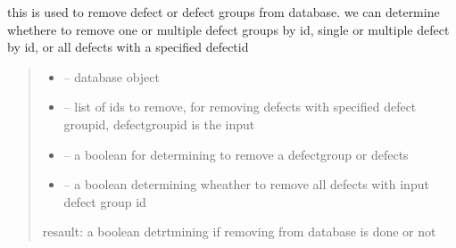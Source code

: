 \documentclass[letterpaper,10pt,english]{sphinxmanual}
\begin{document}

\begin{savenotes}\begin{fulllineitems}
\label{\detokenize{setting/backend/defect_management_funcs:oxin.backend.defect_management_funcs.remove_defects_from_db}}
\pysigstartsignatures
{}
\pysigstopsignatures
\sphinxAtStartPar
this is used to remove defect or defect groups from database.
we can determine whethere to remove one or multiple defect groups by id, single or multiple defect by id, or all defects with a specified defect\sphinxhyphen{}id
\begin{quote}\begin{description}
\begin{itemize}
\item {} 
\sphinxAtStartPar
{} – database object

\item {} 
\sphinxAtStartPar
{} – list of ids to remove, for removing defects with specified defect group\sphinxhyphen{}id, defect\sphinxhyphen{}group\sphinxhyphen{}id is the input

\item {} 
\sphinxAtStartPar
{} – a boolean for determining to remove a defect\sphinxhyphen{}group or defects

\item {} 
\sphinxAtStartPar
{} – a boolean determining wheather to remove all defects with input defect group id

\end{itemize}

\sphinxAtStartPar
resault: a boolean detrtmining if removing from database is done or not

\end{description}\end{quote}

\end{fulllineitems}\end{savenotes}
\end{document}
